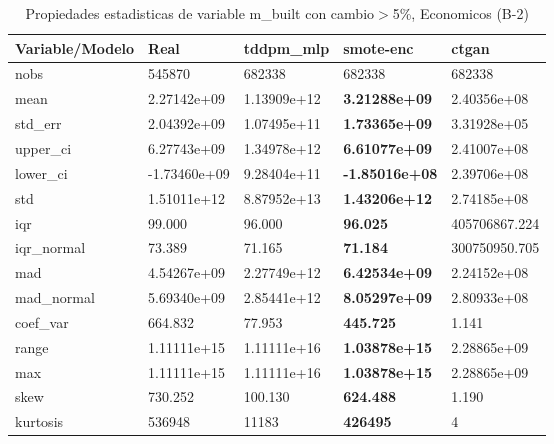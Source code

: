 \begin{table}[H]
\centering
\fontsize{8}{14}\selectfont
\caption{Propiedades estadisticas de variable m\_built con cambio\ensuremath{>}5\%, Economicos (B-2)}
\label{table-stats-economicos-b-2-m_built-short}
\begin{tabular}{|l|m{10em}|m{10em}|m{10em}|m{10em}|}
\hline
 \rowcolor[gray]{0.8}
Variable/Modelo & Real & tddpm\_mlp & smote-enc & ctgan \\
\hline nobs & 545870 & 682338 & 682338 & 682338 \\
\hline mean & 2.27142e+09 & \cellcolor[rgb]{0.9, 0.54, 0.52} 1.13909e+12 & \bfseries 3.21288e+09 & 2.40356e+08 \\
\hline std\_err & 2.04392e+09 & \cellcolor[rgb]{0.9, 0.54, 0.52} 1.07495e+11 & \bfseries 1.73365e+09 & 3.31928e+05 \\
\hline upper\_ci & 6.27743e+09 & \cellcolor[rgb]{0.9, 0.54, 0.52} 1.34978e+12 & \bfseries 6.61077e+09 & 2.41007e+08 \\
\hline lower\_ci & -1.73460e+09 & \cellcolor[rgb]{0.9, 0.54, 0.52} 9.28404e+11 & \bfseries -1.85016e+08 & 2.39706e+08 \\
\hline std & 1.51011e+12 & \cellcolor[rgb]{0.9, 0.54, 0.52} 8.87952e+13 & \bfseries 1.43206e+12 & 2.74185e+08 \\
\hline iqr & 99.000 & 96.000 & \bfseries 96.025 & \cellcolor[rgb]{0.9, 0.54, 0.52} 405706867.224 \\
\hline iqr\_normal & 73.389 & 71.165 & \bfseries 71.184 & \cellcolor[rgb]{0.9, 0.54, 0.52} 300750950.705 \\
\hline mad & 4.54267e+09 & \cellcolor[rgb]{0.9, 0.54, 0.52} 2.27749e+12 & \bfseries 6.42534e+09 & 2.24152e+08 \\
\hline mad\_normal & 5.69340e+09 & \cellcolor[rgb]{0.9, 0.54, 0.52} 2.85441e+12 & \bfseries 8.05297e+09 & 2.80933e+08 \\
\hline coef\_var & 664.832 & 77.953 & \bfseries 445.725 & \cellcolor[rgb]{0.9, 0.54, 0.52} 1.141 \\
\hline range & 1.11111e+15 & \cellcolor[rgb]{0.9, 0.54, 0.52} 1.11111e+16 & \bfseries 1.03878e+15 & 2.28865e+09 \\
\hline max & 1.11111e+15 & \cellcolor[rgb]{0.9, 0.54, 0.52} 1.11111e+16 & \bfseries 1.03878e+15 & 2.28865e+09 \\
\hline skew & 730.252 & 100.130 & \bfseries 624.488 & \cellcolor[rgb]{0.9, 0.54, 0.52} 1.190 \\
\hline kurtosis & 536948 & 11183 & \bfseries 426495 & \cellcolor[rgb]{0.9, 0.54, 0.52} 4 \\

\end{tabular}
\end{table}
